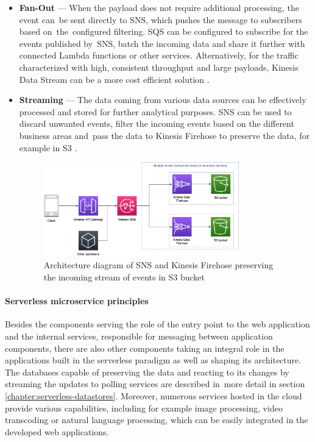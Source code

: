 \begin{itemize}
   \item \textbf{Fan-Out} --- When the payload does not require additional processing, the event can~be sent directly to SNS, which pushes the message to subscribers based on~the~configured filtering. SQS can be configured to subscribe for the events published by~SNS, batch the incoming data and share it further with connected Lambda functions or other services.
   Alternatively, for the traffic characterized with high, consistent throughput and large payloads, Kinesis Data Stream can be a more cost efficient solution \cite{ServerlessArchitecturalPatternsAndBestPractices}.
   
   \item \textbf{Streaming} --- The data coming from various data sources can be effectively processed and stored for further analytical purposes. SNS can be used to discard unwanted events, filter the incoming events based on the different business areas and~pass the data to Kinesis Firehose to preserve the data, for example in S3 \cite{ServerlessArchitecturalPatternsAndBestPractices}.
  
   \begin{figure}[H]
       \centering
       \includegraphics[width=0.8\textwidth]{assets/04-serverless-for-web-apps/streamer.png}
       \caption{Architecture diagram of SNS and Kinesis Firehose preserving the incoming stream of events in S3 bucket}
       \label{fig:streaming-diagram}
   \end{figure}
\end{itemize}

\paragraph{Serverless microservice principles}

Besides the components serving the role of the entry point to the web application and the internal services, responsible for messaging between application components, there are also other components taking an integral role in the applications built in the serverless paradigm as well as shaping its architecture.
The databases capable of preserving the data and reacting to its changes by streaming the updates to polling services are described in~more detail in section \ref{chapter:serverless-datastores}.
Moreover, numerous services hosted in the cloud provide various capabilities, including for example image processing, video transcoding or natural language processing, which can be easily integrated in the developed web applications.

